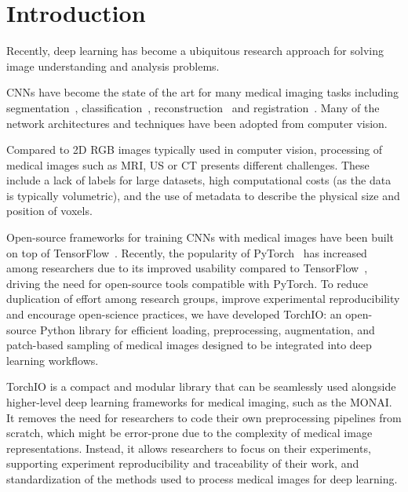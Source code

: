 \section{Introduction}

Recently, deep learning has become a ubiquitous research approach for solving image understanding and analysis problems.

\Acp{CNN} have become the state of the art for many medical imaging tasks including segmentation~\cite{cicek_3d_2016}, classification~\cite{lu_multimodal_2018}, reconstruction~\cite{chen_variable-density_2018} and registration~\cite{shan_unsupervised_2018}.
Many of the network architectures and techniques have been adopted from computer vision.

Compared to 2D \ac{RGB} images typically used in computer vision, processing of medical images such as \ac{MRI}, \ac{US} or \ac{CT} presents different challenges.
These include a lack of labels for large datasets, high computational costs (as the data is typically volumetric), and the use of metadata to describe the physical size and position of voxels.

Open-source frameworks for training \acp{CNN} with medical images have been built on top of TensorFlow~\cite{abadi_tensorflow_2016,pawlowski_dltk_2017,gibson_niftynet_2018}.
Recently, the popularity of PyTorch~\cite{paszke_pytorch_2019} has increased among researchers due to its improved usability compared to TensorFlow~\cite{he_state_2019}, driving the need for open-source tools compatible with PyTorch.
To reduce duplication of effort among research groups, improve experimental reproducibility and encourage open-science practices, we have developed TorchIO: an open-source Python library for efficient loading, preprocessing, augmentation, and patch-based sampling of medical images designed to be integrated into deep learning workflows.

TorchIO is a compact and modular library that can be seamlessly used alongside higher-level deep learning frameworks for medical imaging, such as the \ac{MONAI}.
It removes the need for researchers to code their own preprocessing pipelines from scratch, which might be error-prone due to the complexity of medical image representations.
Instead, it allows researchers to focus on their experiments, supporting experiment reproducibility and traceability of their work, and standardization of the methods used to process medical images for deep learning.
